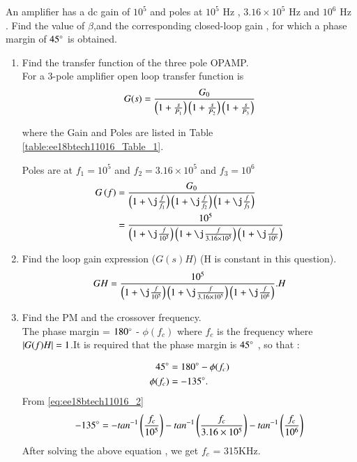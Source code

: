 An amplifier has a dc gain of $10^5$ and poles at $10^5$ Hz , $3.16 \times 10^5$ Hz and $10^6$ Hz . Find the value of $\beta$,and the corresponding closed-loop gain , for which a phase margin of $45\degree$ is obtained. 

\begin{enumerate}[label=\arabic*.,ref=\theenumi]

\item Find the transfer function of the three pole OPAMP.
\\
\solution 
For a 3-pole amplifier open loop transfer function is 
\begin{align}
G(s) = \frac{G_0}{\left(1+\frac{s}{P_{1}}\right)\left(1+\frac{s}{P_{2}}\right)\left(1+\frac{s}{P_{3}}\right)}
\end{align}

where the Gain and Poles are listed in Table \ref{table:ee18btech11016_Table_1}.
%
\begin{table}[!ht]
\centering

\caption{}
\label{table:ee18btech11016_Table_1}
\end{table}

Poles are at $f_{1} =10^5$ and $f_{2} = 3.16\times10^{5}$ and $f_{3} = 10^6$ 
\begin{align}
G\brak{f} &= \frac{G_{0}}{\brak{1+\j\frac{f}{f_{1}}}\brak{1+\j\frac{f}{f_{2}}}\brak{1+\j\frac{f}{f_{3}}}}
\\
&= \frac{10^{5}}{\brak{1+\j\frac{f}{10^5}}\brak{1+\j\frac{f}{3.16\times10^{5}}}\brak{1+\j\frac{f}{10^6}}}
\label{eq:ee18btech11016_1}
\end{align}
\item Find the loop gain expression ($G(s)H$) (H is constant in this question).
\\
\solution 
\begin{align}
GH = \frac{10^{5}}{\brak{1+\j\frac{f}{10^5}}\brak{1+\j\frac{f}{3.16\times10^{5}}}\brak{1+\j\frac{f}{10^6}}} . H
\label{eq:ee18btech11016_2}
\end{align}

\item Find the PM and the crossover frequency.
\\
\solution  
The phase margin = $180\degree$ - $\phi(f_{c})$ where $f_{c}$ is the frequency where $\left\vert G(f)H\right\vert=1$.It is required that the phase margin is $45\degree$ , so that :

\begin{align}
45\degree &=  180\degree - \phi(f_{c})
\\
\phi(f_{c})&=-135\degree.
\end{align}
From \eqref{eq:ee18btech11016_2} 
\begin{align}
-135\degree = -tan^{-1}\left(\frac{f_{c}}{10^5}\right)-tan^{-1}\left(\frac{f_{c}}{3.16\times10^5}\right)-tan^{-1}\left(\frac{f_{c}}{10^6}\right)
\end{align}
After solving the above equation , we get $f_{c}$ = 315KHz.
\\


\end{enumerate}
